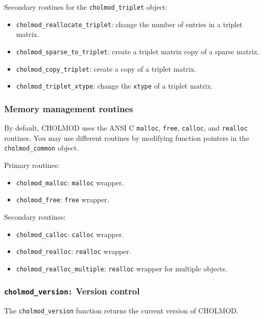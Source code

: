 \documentclass[11pt]{article}
\begin{document}
\noindent Secondary routines for the {\tt cholmod\_triplet} object:
    \begin{itemize}
    \item {\tt cholmod\_reallocate\_triplet}: change the number of entries in a triplet matrix.
    \item {\tt cholmod\_sparse\_to\_triplet}: create a triplet matrix copy of a sparse matrix.
    \item {\tt cholmod\_copy\_triplet}: create a copy of a triplet matrix.
    \item {\tt cholmod\_triplet\_xtype}: change the {\tt xtype} of a triplet matrix.
    \end{itemize}

\subsubsection{Memory management routines}
    By default, CHOLMOD uses the ANSI C {\tt malloc}, {\tt free},
    {\tt calloc}, and {\tt realloc} routines.  You may use different
    routines by modifying function pointers in the {\tt cholmod\_common} object.

\vspace{0.1in}
\noindent Primary routines:
    \begin{itemize}
    \item {\tt cholmod\_malloc}: {\tt malloc} wrapper.
    \item {\tt cholmod\_free}: {\tt free} wrapper.
    \end{itemize}

\noindent Secondary routines:
    \begin{itemize}
    \item {\tt cholmod\_calloc}: {\tt calloc} wrapper.
    \item {\tt cholmod\_realloc}: {\tt realloc} wrapper.
    \item {\tt cholmod\_realloc\_multiple}: {\tt realloc} wrapper for multiple objects.
    \end{itemize}

\subsubsection{{\tt cholmod\_version:} Version control}
The {\tt cholmod\_version} function returns the current version of CHOLMOD.
\end{document}
